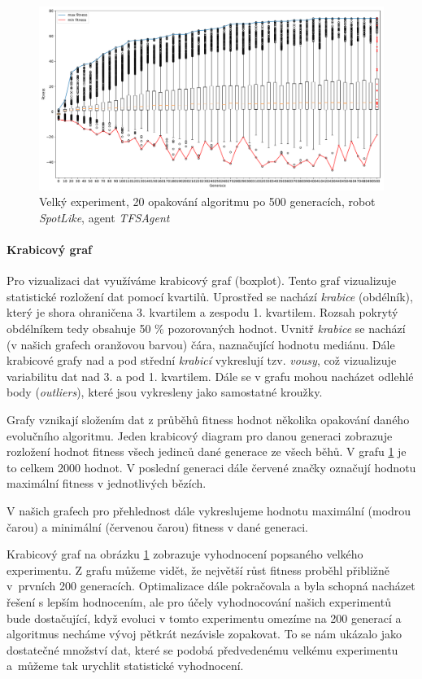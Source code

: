 \begin{figure}[!htb]
    \centering
    \includegraphics[width=1\textwidth]{../img/BIGexperiment1_TFS_10ticks.pdf}
    \caption{Velký experiment, 20 opakování algoritmu po 500 generacích, robot
    \emph{SpotLike}, agent \emph{TFSAgent}}
    \label{fig:exp_big}
\end{figure}

\paragraph{Krabicový graf}
Pro vizualizaci dat využíváme krabicový graf (boxplot). Tento graf vizualizuje
statistické rozložení dat pomocí kvartilů. Uprostřed se nachází \emph{krabice} (obdélník), který je
shora ohraničena 3. kvartilem a zespodu 1. kvartilem. Rozsah pokrytý
obdélníkem tedy obsahuje 50 \% pozorovaných hodnot. Uvnitř \emph{krabice} se
nachází (v našich grafech oranžovou barvou) čára, naznačující hodnotu mediánu.
Dále krabicové grafy nad a pod střední \emph{krabicí} vykreslují tzv.
\emph{vousy}, což vizualizuje variabilitu dat nad 3. a pod 1. kvartilem. Dále
se v grafu mohou nacházet odlehlé body (\emph{outliers}), které jsou vykresleny
jako samostatné kroužky.

Grafy vznikají složením dat z průběhů fitness hodnot několika opakování daného
evolučního algoritmu. Jeden krabicový diagram pro danou generaci zobrazuje
rozložení hodnot fitness všech jedinců dané generace ze všech běhů. V grafu
\ref{fig:exp_big} je to celkem 2000 hodnot. V poslední generaci dále červené
značky označují hodnotu maximální fitness v jednotlivých bězích. 

V našich grafech pro přehlednost dále vykreslujeme hodnotu maximální (modrou
čarou) a minimální (červenou čarou) fitness v dané generaci.

Krabicový graf na obrázku \ref{fig:exp_big} zobrazuje vyhodnocení popsaného
velkého experimentu. Z grafu můžeme vidět, že největší růst fitness proběhl
přibližně v~prvních 200 generacích. Optimalizace dále pokračovala a byla
schopná nacházet řešení s lepším hodnocením, ale pro účely vyhodnocování našich 
experimentů bude dostačující, když evoluci v tomto experimentu omezíme na 200
generací a algoritmus necháme vývoj pětkrát nezávisle zopakovat. To se nám
ukázalo jako dostatečné množství dat, které se podobá předvedenému velkému
experimentu a~můžeme tak urychlit statistické vyhodnocení. 


